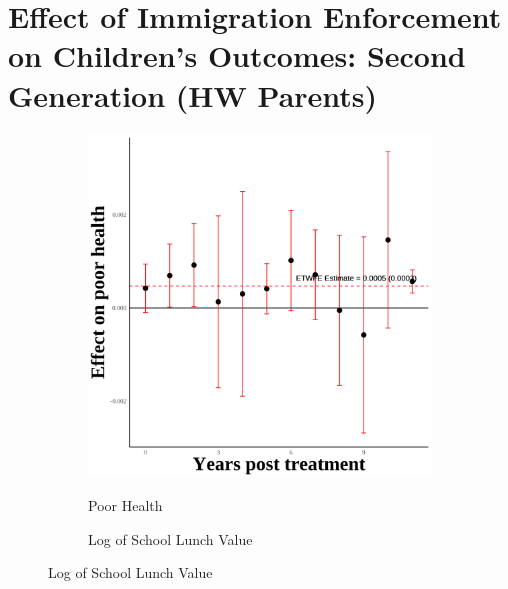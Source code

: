 \documentclass[12pt,english]{article}
\begin{document}
\pagebreak

\section{Effect of Immigration Enforcement on Children's Outcomes: Second Generation (HW Parents)}
\begin{figure}[H]
  \caption{Effect of Immigration Enforcement on Second Generation Outcomes: HW Parents}
  \centering

  \begin{subfigure}[b]{0.3\textwidth}
    \centering
    \caption{Poor Health}
    \includegraphics[width=\linewidth]{figures/plot34-poor_health_event_study-secgen-hw.png}
    \label{fig:poor-health-secgen-hw}
  \end{subfigure}
  \hfill
  \begin{subfigure}[b]{0.3\textwidth}
    \centering
    \caption{Log of School Lunch Value}

\end{subfigure}
\end{figure}
\end{document}
